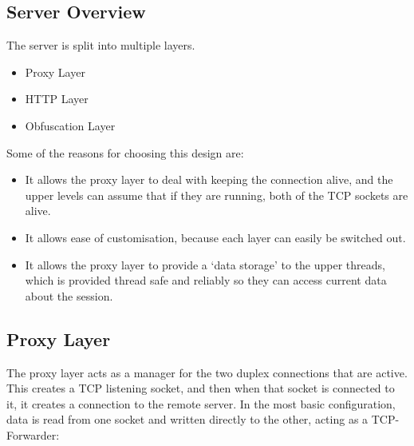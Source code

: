 \subsection{Server Overview}
The server is split into multiple layers.
\begin{itemize}
    \item Proxy Layer
    \item HTTP Layer
    \item Obfuscation Layer
\end{itemize}
Some of the reasons for choosing this design are:
\begin{itemize}
    \item It allows the proxy layer to deal with keeping the connection alive, and the upper levels can assume that if they are running, both of the TCP sockets are alive.
    \item It allows ease of customisation, because each layer can easily be switched out.
    \item It allows the proxy layer to provide a `data storage' to the upper threads, which is provided thread safe and reliably so they can access current data about the session.
\end{itemize}


\subsection{Proxy Layer}
The proxy layer acts as a manager for the two duplex connections that are active. This creates a TCP listening socket, and then when that socket is connected to it, it creates a connection to the remote server.
In the most basic configuration, data is read from one socket and written directly to the other, acting as a TCP-Forwarder:
\begin{center}
\end{center}

